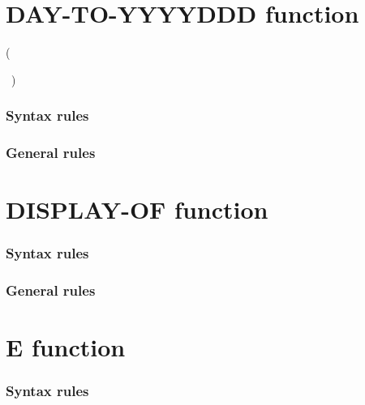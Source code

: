 \section{DAY-TO-YYYYDDD function}

\begin{syntax}
    (
  \argument
  \begin{0-1}
    \argument
    \begin{0-1}
      \argument
    \end{0-1}
  \end{0-1}
  \ {})
\end{syntax}

\subsubsection{Syntax rules}

\subsubsection{General rules}

\section{DISPLAY-OF function}

\begin{syntax}
\end{syntax}

\subsubsection{Syntax rules}

\subsubsection{General rules}

\section{E function}

\begin{syntax}
   
\end{syntax}

\subsubsection{Syntax rules}

